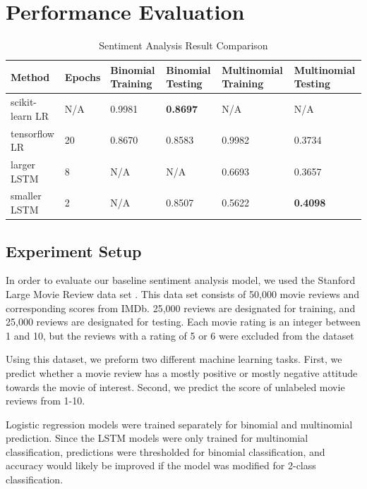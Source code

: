 \documentclass[conference]{IEEEtran}
\begin{document}
\section{Performance Evaluation}
\label{performance}
    \begin{table}[]
        \centering
        \caption{Sentiment Analysis Result Comparison}
        \label{my-label}
        \begin{tabularx}{\textwidth}{ X X X  X X  X }
        \toprule
        Method & Epochs & Binomial Training & Binomial Testing & Multinomial Training & Multinomial Testing \\
        \midrule
        scikit-learn LR & N/A & 0.9981 & \textbf{0.8697} & N/A & N/A \\
        tensorflow LR & 20 &  0.8670 & 0.8583 & 0.9982 & 0.3734 \\
        larger LSTM & 8 & N/A & N/A & 0.6693 & 0.3657 \\
        smaller LSTM  & 2 & N/A    & 0.8507 & 0.5622   & \textbf{0.4098} \\
        \bottomrule
        \end{tabularx}
    \end{table}
\subsection{Experiment Setup}
    In order to evaluate our baseline sentiment analysis model, we used the
    Stanford Large Movie Review data set \cite{maas2011learning}. This data
    set consists of 50,000 movie reviews and corresponding scores from IMDb.
    25,000 reviews are designated for training, and 25,000 reviews are designated for testing.
    Each movie rating is an integer between 1 and 10, but the reviews with a rating
    of 5 or 6 were excluded from the dataset
    
    Using this dataset, we preform
    two different machine learning tasks. First, we predict whether a movie review
    has a mostly positive or mostly negative attitude towards the movie of interest. 
    Second, we predict the score of unlabeled movie reviews from 1-10.
    
    Logistic regression models were trained separately for binomial and multinomial
    prediction. Since the LSTM models were  only trained 
    for multinomial classification, predictions were thresholded for binomial 
    classification, and accuracy would likely be improved if the model was modified
    for 2-class classification.
    
\end{document}
